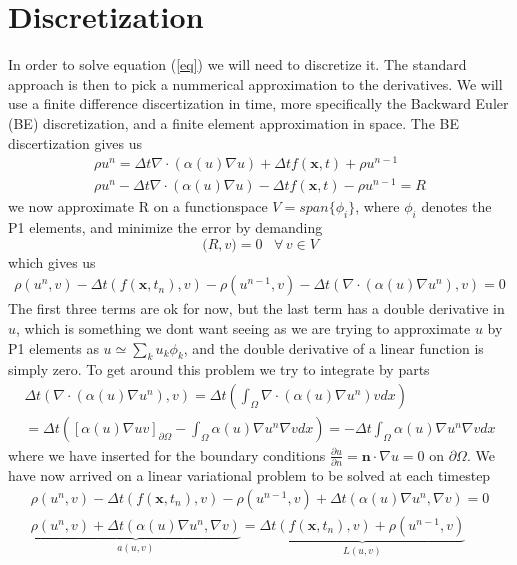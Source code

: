 \documentclass[a4paper,english, 10pt, twoside]{article}
\renewcommand{\d}{\partial}
\begin{document}
\section*{Discretization}
In order to solve equation (\ref{eq}) we will need to discretize it. The standard approach is then to pick a nummerical approximation to the 
derivatives. We will use a finite difference discertization in time, more specifically the Backward Euler (BE) discretization, and a finite element 
approximation in space. The BE discertization gives us
\begin{align*}
 \rho u^n = \Delta t\nabla\cdot(\alpha(u)\nabla u) +\Delta t f(\mathbf{x},t) +\rho u^{n-1} \\
 \rho u^n - \Delta t\nabla\cdot(\alpha(u)\nabla u) -\Delta t f(\mathbf{x},t) -\rho u^{n-1} = R
\end{align*}
we now approximate R on a functionspace $V = span\{\phi_i\}$, where $\phi_i$ denotes the P1 elements, and minimize the error by demanding
$$
\big(R,v\big) = 0 \;\;\; \forall \,v\in V
$$
which gives us 
\begin{align*}
  \rho (u^n,v)  -\Delta t (f(\mathbf{x},t_n),v) -\rho (u^{n-1},v) - \Delta t(\nabla\cdot(\alpha(u)\nabla u^n),v)= 0 
\end{align*}
The first three terms are ok for now, but the last term has a double derivative in $u$, which is something we dont want seeing as we are trying to 
approximate $u$ by P1 elements as $u \simeq \sum\limits_{k}u_k\phi_k$, and the double derivative of a linear function is simply zero. To get around 
this problem we try to integrate by parts
\begin{align*}
 \Delta t(\nabla\cdot(\alpha(u)\nabla u^n),v) = \Delta t\left(\int_\Omega \nabla\cdot(\alpha(u)\nabla u^n)vdx\right)\\
 =\Delta t \left(\left[\alpha(u)\nabla u v\right]_{\d \Omega}-\int_\Omega \alpha(u)\nabla u^n\nabla vdx\right) = -\Delta t\int_\Omega 
 \alpha(u)\nabla u^n\nabla vdx
\end{align*}
where we have inserted for the boundary conditions $\frac{\d u}{\d n} = \mathbf{n}\cdot\nabla u = 0$ on $\d\Omega$. We have now arrived on a 
linear variational problem to be solved at each timestep
\begin{align*}
  \rho (u^n,v)  -\Delta t (f(\mathbf{x},t_n),v) -\rho (u^{n-1},v) + \Delta t(\alpha(u)\nabla u^n,\nabla v)= 0  \\
   \underbrace{\rho (u^n,v)   + \Delta t(\alpha(u)\nabla u^n,\nabla v)}_{a(u,v)}=  \underbrace{\Delta t (f(\mathbf{x},t_n),v) +\rho 
   (u^{n-1},v)}_{L(u,v)}
\end{align*}
\end{document}
